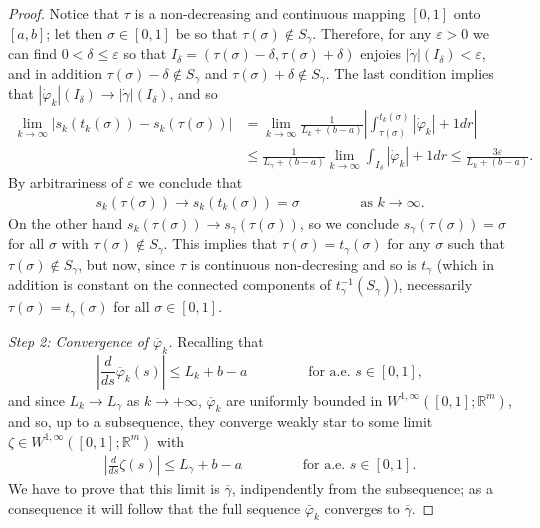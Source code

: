 \documentclass[a4paper,11pt]{article}
\numberwithin{equation}{section}
\newcommand{\R}{\mathbb{R}}
\begin{document}
\begin{proof}
	Notice that $\tau$ is a non-decreasing and continuous mapping $[0,1]$ onto $[a,b]$; let then $\sigma\in [0,1]$ be so that $\tau(\sigma)\notin S_\gamma$. Therefore, for any $\varepsilon>0$ we can find $0<\delta\leq \varepsilon$ so that $I_\delta=(\tau(\sigma)-\delta,\tau(\sigma)+\delta)$ enjoies $|\dot\gamma|(I_\delta)<\varepsilon$, and in addition $\tau(\sigma)-\delta\notin S_\gamma$ and $\tau(\sigma)+\delta\notin S_\gamma$. The last condition implies that $|\dot\varphi_k|(I_\delta)\rightarrow|\dot\gamma|(I_\delta)$, and so
	\begin{align*}
\lim_{k\rightarrow \infty}|s_k(t_k(\sigma))-s_k(\tau(\sigma))|&=\lim_{k\rightarrow \infty}\frac{1}{L_k+(b-a)}\left|\int_{\tau(\sigma)}^{t_k(\sigma)}|\dot\varphi_k|+1dr\right|\\&\leq\frac{1}{L_\gamma+(b-a)} \lim_{k\rightarrow \infty}\int_{I_\delta}|\dot\varphi_k|+1dr\leq\frac{3\varepsilon}{L_k+(b-a)}.
	\end{align*}
	By arbitrariness of $\varepsilon$ we conclude that \begin{align}\label{limitsk}
s_k(\tau(\sigma))\rightarrow s_k(t_k(\sigma))=\sigma\qquad \qquad \text{ as }k\rightarrow\infty.
	\end{align}
On the other hand $s_k(\tau(\sigma))\rightarrow s_\gamma(\tau(\sigma))$, so we conclude $s_\gamma(\tau(\sigma))=\sigma$ for all $\sigma$ with $\tau(\sigma)\notin S_\gamma$. This implies that $\tau(\sigma)=t_\gamma(\sigma)$ for any $\sigma$ such that $\tau(\sigma)\notin S_\gamma$, but now, since $\tau$ is continuous non-decresing and so is $t_\gamma$ (which in addition is constant on the connected components of $t_\gamma^{-1}(S_\gamma)$), necessarily $\tau(\sigma)=t_\gamma(\sigma)$ for all $\sigma\in [0,1]$.
	
	
		\textit{Step 2: Convergence of ${\overline \varphi_k}$.}
	Recalling  that 
	$$|\frac{d}{ds}\overline \varphi_k(s)|\leq {L_k+b-a}\qquad\qquad \text{ for a.e. }s\in [0,1],$$
	and since $L_k\rightarrow L_\gamma$ as $k\rightarrow+\infty$, $\overline \varphi_k$ are uniformly bounded in $W^{1,\infty}([0,1];\R^m)$, and so, up to a subsequence, they converge weakly star to some limit $\zeta\in W^{1,\infty}([0,1];\R^m)$ with 
		\begin{align}\label{lunghezzasalto}
		|\frac{d}{ds}\zeta(s)|\leq {L_\gamma+b-a}\qquad\qquad \text{ for a.e. }s\in [0,1].
	\end{align} We have to prove  that this limit is $\overline \gamma$, indipendently from the subsequence; as a consequence it will follow that the full sequence $\overline \varphi_k$ converges to  $\overline \gamma$. 


\end{proof}
\end{document}
